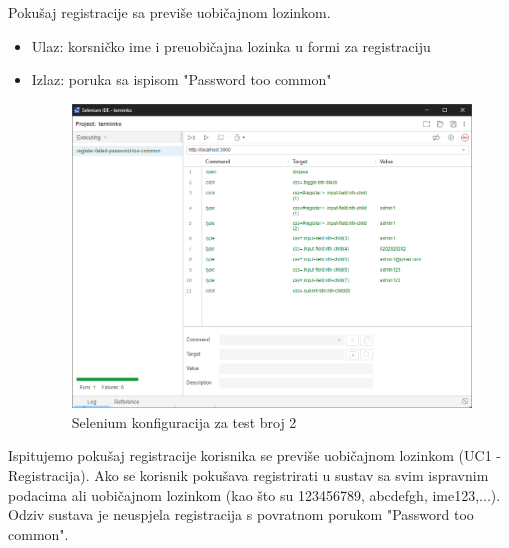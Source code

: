 \begin{packed_enum}
	 		\item Pokušaj registracije sa previše uobičajnom lozinkom.
	 		\begin{itemize}
	 			\item Ulaz: korsničko ime i preuobičajna lozinka u formi za registraciju
	 			\item Izlaz: poruka sa ispisom "Password too common"
	 			\begin{figure}[H]
	 				\includegraphics[width=0.95\linewidth]{slike/test1.png}
	 				\centering
	 				\caption{Selenium konfiguracija za test broj 2}
	 				\label{fig:dijagram_razmjestaja}
	 			\end{figure}
	 		\end{itemize}
 			Ispitujemo pokušaj registracije korisnika se previše uobičajnom lozinkom (UC1 - Registracija). Ako se korisnik pokušava registrirati u sustav sa svim ispravnim podacima ali uobičajnom lozinkom (kao što su 123456789, abcdefgh, ime123,...). Odziv sustava je neuspjela registracija s povratnom porukom "Password too common".
 			\eject
 		

\end{packed_enum}
